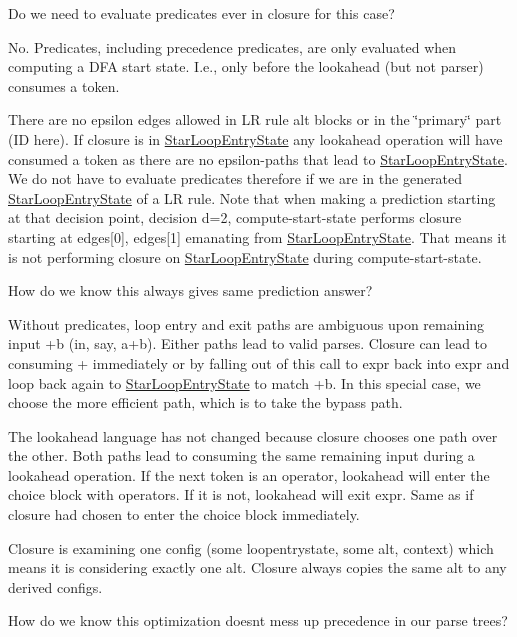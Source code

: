 Do we need to evaluate predicates ever in closure for this case?

No. Predicates, including precedence predicates, are only evaluated when computing a D\+FA start state. I.\+e., only before the lookahead (but not parser) consumes a token.

There are no epsilon edges allowed in LR rule alt blocks or in the \char`\"{}primary\char`\"{} part (ID here). If closure is in \hyperlink{classantlr4_1_1atn_1_1StarLoopEntryState}{Star\+Loop\+Entry\+State} any lookahead operation will have consumed a token as there are no epsilon-\/paths that lead to \hyperlink{classantlr4_1_1atn_1_1StarLoopEntryState}{Star\+Loop\+Entry\+State}. We do not have to evaluate predicates therefore if we are in the generated \hyperlink{classantlr4_1_1atn_1_1StarLoopEntryState}{Star\+Loop\+Entry\+State} of a LR rule. Note that when making a prediction starting at that decision point, decision d=2, compute-\/start-\/state performs closure starting at edges\mbox{[}0\mbox{]}, edges\mbox{[}1\mbox{]} emanating from \hyperlink{classantlr4_1_1atn_1_1StarLoopEntryState}{Star\+Loop\+Entry\+State}. That means it is not performing closure on \hyperlink{classantlr4_1_1atn_1_1StarLoopEntryState}{Star\+Loop\+Entry\+State} during compute-\/start-\/state.

How do we know this always gives same prediction answer?

Without predicates, loop entry and exit paths are ambiguous upon remaining input +b (in, say, a+b). Either paths lead to valid parses. Closure can lead to consuming + immediately or by falling out of this call to expr back into expr and loop back again to \hyperlink{classantlr4_1_1atn_1_1StarLoopEntryState}{Star\+Loop\+Entry\+State} to match +b. In this special case, we choose the more efficient path, which is to take the bypass path.

The lookahead language has not changed because closure chooses one path over the other. Both paths lead to consuming the same remaining input during a lookahead operation. If the next token is an operator, lookahead will enter the choice block with operators. If it is not, lookahead will exit expr. Same as if closure had chosen to enter the choice block immediately.

Closure is examining one config (some loopentrystate, some alt, context) which means it is considering exactly one alt. Closure always copies the same alt to any derived configs.

How do we know this optimization doesn\textquotesingle{}t mess up precedence in our parse trees?

